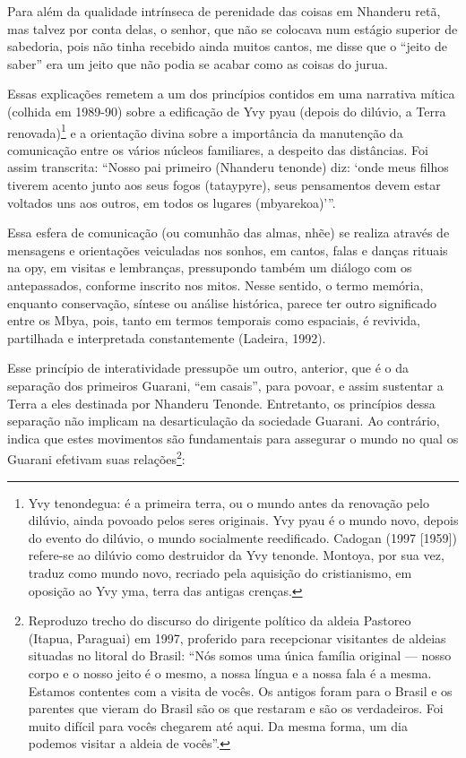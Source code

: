 Para além da qualidade intrínseca de perenidade das coisas em Nhanderu
retã, mas talvez por conta delas, o senhor, que não se colocava num
estágio superior de sabedoria, pois não tinha recebido ainda muitos
cantos, me disse que o ``jeito de saber'' era um jeito que não podia se
acabar como as coisas do jurua.

Essas explicações remetem a um dos princípios contidos em uma narrativa
mítica (colhida em 1989-90) sobre a edificação de Yvy pyau (depois do
dilúvio, a Terra renovada)\footnote{Yvy tenondegua: é a primeira terra,
ou o mundo antes da renovação pelo dilúvio, ainda povoado pelos seres
originais. Yvy pyau é o mundo novo, depois do evento do dilúvio, o
mundo socialmente reedificado. Cadogan (1997 [1959]) refere-se ao
dilúvio como destruidor da Yvy tenonde. Montoya, por sua vez, traduz
como mundo novo, recriado pela aquisição do cristianismo, em oposição
ao Yvy yma, terra das antigas crenças. } e a orientação divina sobre a
importância da manutenção da comunicação entre os vários núcleos
familiares, a despeito das distâncias. Foi assim transcrita: ``Nosso pai
primeiro (Nhanderu tenonde) diz: ‘onde meus filhos tiverem acento junto
aos seus fogos (tataypyre), seus pensamentos devem estar voltados uns
aos outros, em todos os lugares (mbyarekoa)’''. 

Essa esfera de comunicação (ou comunhão das almas, nhẽe) se
realiza através de mensagens e orientações veiculadas nos sonhos, em
cantos, falas e danças rituais na opy, em visitas e lembranças,
pressupondo também um diálogo com os antepassados, conforme inscrito
nos mitos. Nesse sentido, o termo memória, enquanto conservação,
síntese ou análise histórica, parece ter outro significado entre os
Mbya, pois, tanto em termos temporais como espaciais, é revivida,
partilhada e interpretada constantemente (Ladeira, 1992).  

Esse princípio de interatividade pressupõe um outro, anterior, que é o
da separação dos primeiros Guarani, ``em casais'', para povoar, e assim
sustentar a Terra a eles destinada por Nhanderu Tenonde. Entretanto, os
princípios dessa separação não implicam na desarticulação da sociedade
Guarani. Ao contrário, indica que estes movimentos são fundamentais
para assegurar o mundo no qual os Guarani efetivam suas
relações\footnote{Reproduzo trecho do discurso do dirigente político da
aldeia Pastoreo (Itapua, Paraguai) em 1997, proferido para recepcionar
visitantes de aldeias situadas no litoral do Brasil: ``Nós somos uma
única família original --- nosso corpo e o nosso jeito é o mesmo, a nossa
língua e a nossa fala é a mesma. Estamos contentes com a visita de
vocês. Os antigos foram para o Brasil e os parentes que vieram do
Brasil são os que restaram e são os verdadeiros. Foi muito difícil para
vocês chegarem até aqui. Da mesma forma, um dia podemos visitar a
aldeia de vocês''.}:

